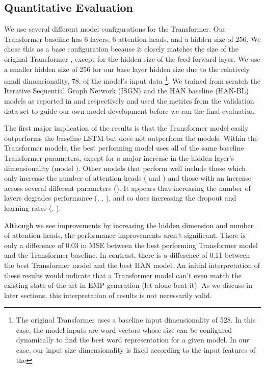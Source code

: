 \subsection{Quantitative Evaluation}
We use several different model configurations for the Transformer. Our Transformer baseline has 6 layers, 6 attention heads, and a hidden size of 256. We chose this as a base configuration because it closely matches the size of the original Transformer \cite{vaswani2017attention}, except for the hidden size of the feed-forward layer. We use a smaller hidden size of 256 for our base layer hidden size due to the relatively small dimensionality, 78, of the model's input data%
\footnote{The original Transformer uses a baseline input dimensionality of 528. In this case, the model inputs are word vectors whose size can be configured dynamically to find the best word representation for a given model. In our case, our input size dimensionality is fixed according to the input features of the \vnetf{}}. We trained from scratch the Iterative Sequential Graph Network (ISGN) and the HAN baseline (HAN-BL) models as reported in \cite{jeong2019graph} and \cite{jeong2019virtuosonet} respectively and used the metrics from the validation data set to guide our own model development before we ran the final evaluation. %



The first major implication of the results is that the Transformer model easily outperforms the baseline LSTM but does not outperform the \vnet{} models. Within the Transformer models, the best performing model uses all of the same baseline Transformer parameters, except for a major increase in the hidden layer's dimensionality (model ). Other models that perform well include those which only increase the number of attention heads ( and ) and those with an increase across several different parameters (). It appears that increasing the number of layers degrades performance (, , ), and so does increasing the dropout and learning rates (, ). 

Although we see improvements by increasing the hidden dimension and number of attention heads, the performance improvements aren't significant. There is only a difference of 0.03 in MSE between the best performing Transformer model and the Transformer baseline. In contrast, there is a difference of 0.11 between the best Transformer model and the best HAN model. An initial interpretation of these results would indicate that a Transformer model can't even match the existing state of the art in EMP generation (let alone beat it). As we discuss in later sections, this interpretation of results is not necessarily valid. 